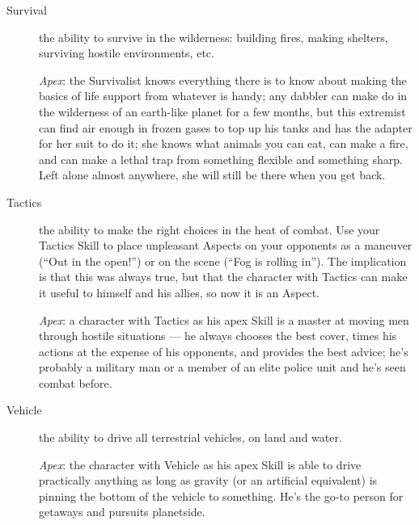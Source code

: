 \begin{description}
\item[Survival]
the ability to survive in the wilderness: building fires, making shelters, surviving hostile environments, etc.

\emph{Apex}: the Survivalist knows everything there is to know about making the basics of life support from whatever is handy; any dabbler can make do in the wilderness of an earth-like planet for a few months, but this extremist can find air enough in frozen gases to top up his tanks and has the adapter for her suit to do it; she knows what animals you can eat, can make a fire, and can make a lethal trap from something flexible and something sharp. Left alone almost anywhere, she will still be there when you get back.

\item[Tactics]
the ability to make the right choices in the heat of combat. Use your Tactics Skill to place unpleasant Aspects on your opponents as a maneuver (``Out in the open!'') or on the scene (``Fog is rolling in''). The implication is that this was always true, but that the character with Tactics can make it useful to himself and his allies, so now it is an Aspect.

\emph{Apex}: a character with Tactics as his apex Skill is a master at moving men through hostile situations --- he always chooses the best cover, times his actions at the expense of his opponents, and provides the best advice; he's probably a military man or a member of an elite police unit and he's seen combat before.

\item[Vehicle]
the ability to drive all terrestrial vehicles, on land and water.

\emph{Apex}: the character with Vehicle as his apex Skill is able to drive practically anything as long as gravity (or an artificial equivalent) is pinning the bottom of the vehicle to something. He's the go-to person for getaways and pursuits planetside.
\end{description}

